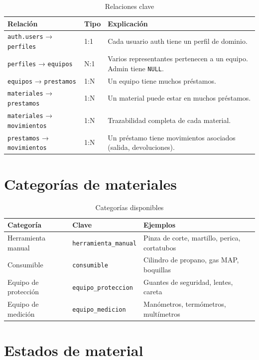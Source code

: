 \documentclass[12pt,a4paper,oneside]{report}
\newcommand{\file}[1]{\texttt{\color{cecyteDark}#1}}
\begin{document}
\begin{table}[H]
\centering
\caption{Relaciones clave}
\begin{tabular}{@{}L{4.5cm}L{2.5cm}L{8.5cm}@{}}
\toprule
{}
\textbf{Relación} & \textbf{Tipo} & \textbf{Explicación} \\
\midrule
\file{auth.users} → \file{perfiles}   & 1:1 & Cada usuario auth tiene un perfil de dominio. \\
\file{perfiles} → \file{equipos}      & N:1 & Varios representantes pertenecen a un equipo. Admin tiene \file{NULL}. \\
\file{equipos} → \file{prestamos}     & 1:N & Un equipo tiene muchos préstamos. \\
\file{materiales} → \file{prestamos}  & 1:N & Un material puede estar en muchos préstamos. \\
\file{materiales} → \file{movimientos}& 1:N & Trazabilidad completa de cada material. \\
\file{prestamos} → \file{movimientos} & 1:N & Un préstamo tiene movimientos asociados (salida, devoluciones). \\
\bottomrule
\end{tabular}
\end{table}

\section{Categorías de materiales}

\begin{table}[H]
\centering
\caption{Categorías disponibles}
\begin{tabular}{@{}L{4cm}L{4.5cm}L{7cm}@{}}
\toprule
{}
\textbf{Categoría} & \textbf{Clave} & \textbf{Ejemplos} \\
\midrule
Herramienta manual  & \file{herramienta\_manual}  & Pinza de corte, martillo, perica, cortatubos \\
Consumible          & \file{consumible}          & Cilindro de propano, gas MAP, boquillas \\
Equipo de protección& \file{equipo\_proteccion}  & Guantes de seguridad, lentes, careta \\
Equipo de medición  & \file{equipo\_medicion}    & Manómetros, termómetros, multímetros \\
\bottomrule
\end{tabular}
\end{table}

\section{Estados de material}
\end{document}
